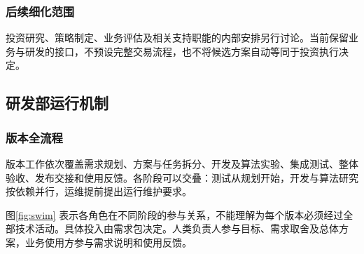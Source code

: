 \documentclass[11pt,a4paper]{article}
\begin{document}
\subsubsection{后续细化范围}
投资研究、策略制定、业务评估及相关支持职能的内部安排另行讨论。当前保留业务与研发的接口，不预设完整交易流程，也不将候选方案自动等同于投资执行决定。

\subsection{研发部运行机制}

\subsubsection{版本全流程}
版本工作依次覆盖需求规划、方案与任务拆分、开发及算法实验、集成测试、整体验收、发布交接和使用反馈。各阶段可以交叠：测试从规划开始，开发与算法研究按依赖并行，运维提前提出运行维护要求。

图\ref{fig:swim} 表示各角色在不同阶段的参与关系，不能理解为每个版本必须经过全部技术活动。具体投入由需求包决定。人类负责人参与目标、需求取舍及总体方案，业务使用方参与需求说明和使用反馈。
\end{document}
